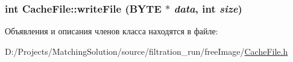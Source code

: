 \hypertarget{class_cache_file_6c425a1386901f1760db7dc4992c2edb}{
\subsubsection[{writeFile}]{\setlength{\rightskip}{0pt plus 5cm}int CacheFile::writeFile ({\bf BYTE} $\ast$ {\em data}, \/  int {\em size})}}
\label{class_cache_file_6c425a1386901f1760db7dc4992c2edb}




Объявления и описания членов класса находятся в файле:\begin{CompactItemize}
\item 
D:/Projects/MatchingSolution/source/filtration\_\-run/freeImage/\hyperlink{_cache_file_8h}{CacheFile.h}\end{CompactItemize}
